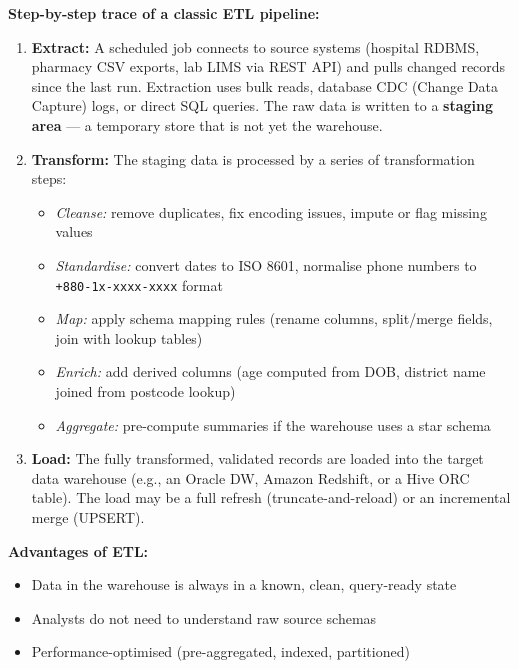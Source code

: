 \documentclass[12pt,a4paper]{article}
\begin{document}
\textbf{Step-by-step trace of a classic ETL pipeline:}

\begin{enumerate}[leftmargin=2.2em, itemsep=8pt]
  \item \textbf{Extract:}  A scheduled job connects to source systems (hospital RDBMS, pharmacy CSV exports, lab LIMS via REST API) and pulls changed records since the last run.  Extraction uses bulk reads, database CDC (Change Data Capture) logs, or direct SQL queries.  The raw data is written to a \textbf{staging area} --- a temporary store that is not yet the warehouse.

  \item \textbf{Transform:}  The staging data is processed by a series of transformation steps:
    \begin{itemize}[leftmargin=1.5em, nosep]
      \item \textit{Cleanse:} remove duplicates, fix encoding issues, impute or flag missing values
      \item \textit{Standardise:} convert dates to ISO 8601, normalise phone numbers to \texttt{+880-1x-xxxx-xxxx} format
      \item \textit{Map:} apply schema mapping rules (rename columns, split/merge fields, join with lookup tables)
      \item \textit{Enrich:} add derived columns (age computed from DOB, district name joined from postcode lookup)
      \item \textit{Aggregate:} pre-compute summaries if the warehouse uses a star schema
    \end{itemize}

  \item \textbf{Load:}  The fully transformed, validated records are loaded into the target data warehouse (e.g., an Oracle DW, Amazon Redshift, or a Hive ORC table).  The load may be a full refresh (truncate-and-reload) or an incremental merge (UPSERT).
\end{enumerate}

\textbf{Advantages of ETL:}
\begin{itemize}[leftmargin=1.8em, nosep]
  \item Data in the warehouse is always in a known, clean, query-ready state
  \item Analysts do not need to understand raw source schemas
  \item Performance-optimised (pre-aggregated, indexed, partitioned)
\end{itemize}
\end{document}
